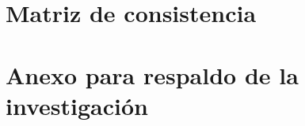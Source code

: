 \documentclass[12pt,a4paper,oneside]{report}
\begin{document}

\renewcommand*{\bibname}{REFERENCIAS}
\newpage



\appendix
\clearpage
\addappheadtotoc
\appendixpage

\chapter{Matriz de consistencia}

\chapter{Anexo para respaldo de la investigación}
\end{document}
